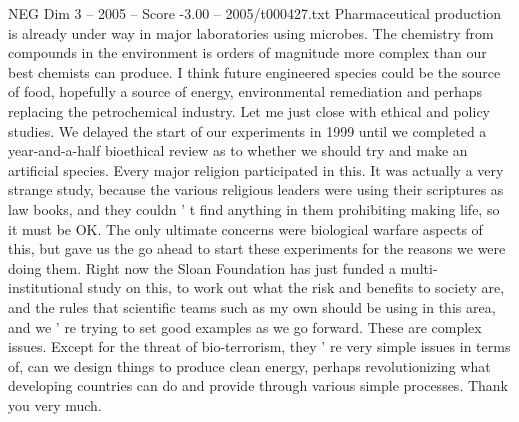 \begin{textsample}{NEG Dim 3 – 2005 – Score -3.00 – 2005/t000427.txt}
Pharmaceutical production is already under way in major laboratories using microbes.
The chemistry from compounds in the environment is orders of magnitude more complex than our best chemists can produce.
I think future engineered species could be the source of food, hopefully a source of energy, environmental remediation and perhaps replacing the petrochemical industry.
Let me just close with ethical and policy studies.
We delayed the start of our experiments in 1999 until we completed a year-and-a-half bioethical review as to whether we should try and make an artificial species.
Every major religion participated in this.
It was actually a very strange study, because the various religious leaders were using their scriptures as law books, and they couldn ' t find anything in them prohibiting making life, so it must be OK.
The only ultimate concerns were biological warfare aspects of this, but gave us the go ahead to start these experiments for the reasons we were doing them.
Right now the Sloan Foundation has just funded a multi-institutional study on this, to work out what the risk and benefits to society are, and the rules that scientific teams such as my own should be using in this area, and we ' re trying to set good examples as we go forward.
These are complex issues.
Except for the threat of bio-terrorism, they ' re very simple issues in terms of, can we design things to produce clean energy, perhaps revolutionizing what developing countries can do and provide through various simple processes.
Thank you very much.

\end{textsample}
